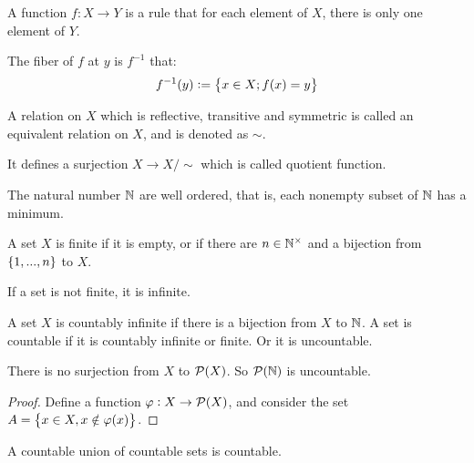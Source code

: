\begin{definition}
    A function $f : X \rightarrow Y$ is a rule that for each element of $X$, there is only one element of $Y$.
\end{definition}

\begin{definition}
    The fiber of $f$ at $y$ is $f^{-1}$ that:
    \begin{equation}
        f^{-1}(y) := \set{x \in X; f(x) = y}
    \end{equation}
\end{definition}

\begin{definition}
    A relation on $X$ which is reflective, transitive and symmetric is called an equivalent relation on $X$, and is denoted as $\sim$.
    
    It defines a surjection $X \rightarrow X / \sim$ which is called quotient function.
\end{definition}



\begin{theorem}
    The natural number $\mathbb{N}$ are well ordered, that is, each nonempty subset of $\mathbb{N}$ has a minimum.
\end{theorem}


\begin{definition}
    A set $X$ is finite if it is empty, or if there are $n \in \mathbb{N}^{\times}$ and a bijection from $\set{1, ..., n}$ to $X$.
    
    If a set is not finite, it is infinite.
    
    A set $X$ is countably infinite if there is a bijection from $X$ to $\mathbb{N}$. A set is countable if it is countably infinite or finite. Or it is uncountable.
\end{definition}

\begin{theorem}
    There is no surjection from $X$ to $\mathcal{P}(X)$. So $\mathcal{P}(\mathbb{N})$ is uncountable.
\end{theorem}
\begin{proof}
    Define a function $\varphi: X \rightarrow \mathcal{P}(X)$, and consider the set $A = \set{x\in X, x \notin \varphi(x)}$.
\end{proof}


\begin{theorem}
A countable union of countable sets is countable.    
\end{theorem}

